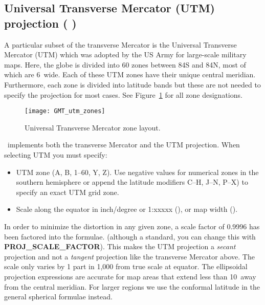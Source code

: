 

\subsection{Universal Transverse Mercator (UTM) projection ( )} 

A particular subset of the transverse Mercator is the
Universal Transverse Mercator (UTM) which was adopted
by the US Army for large-scale military maps.  Here, the
globe is divided into 60 zones between 84\DS S and
84\DS N, most of which are 6\DS\ wide.  Each of
these UTM zones have their unique central meridian.
Furthermore, each zone is divided into latitude bands
but these are not needed to specify the projection for
most cases.  See Figure~\ref{fig:GMT_utm_zones} for all
zone designations.

\begin{figure}[htb]
   \texttt{[image: GMT\_utm\_zones]}
   \caption{Universal Transverse Mercator zone layout.}
   \label{fig:GMT_utm_zones}
\end{figure}

\GMT\ implements both the transverse Mercator and the
UTM projection.  When selecting UTM you must specify:

\begin{itemize} 
\item UTM zone (A, B, 1--60, Y, Z).  Use negative values for numerical zones in the southern hemisphere
or append the latitude modifiers C--H, J--N, P--X) to specify an exact UTM grid zone.
\item Scale along the equator in inch/degree or 1:xxxxx (), or map width ().
\end{itemize} 

In order to minimize the distortion in any given zone,
a scale factor of 0.9996 has been factored into the formulae.
(although a standard, you can change this with \textbf{PROJ\_SCALE\_FACTOR}).
This makes the UTM projection a \emph{secant} projection and not
a \emph{tangent} projection like the transverse Mercator above.
The scale only varies by 1 part in 1,000 from true scale at
equator.  The ellipsoidal projection expressions are accurate for map areas
that extend less than 10\DS\ away from the central meridian.  For
larger regions we use the conformal latitude in the general spherical
formulae instead.

